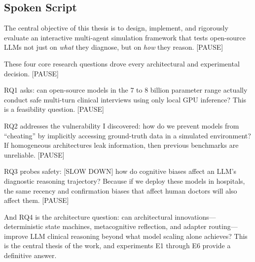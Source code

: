 \documentclass[12pt]{article}
\begin{document}
  \subsection*{Spoken Script}
  \begin{spokenbox}
   The central objective of this thesis is to design, implement, and rigorously evaluate an interactive multi-agent simulation framework that tests open-source LLMs not just on \textit{what} they diagnose, but on \textit{how} they reason. [PAUSE]

  These four core research questions drove every architectural and experimental decision. [PAUSE]

  RQ1 asks: can open-source models in the 7 to 8 billion parameter range actually conduct safe multi-turn clinical interviews using only local GPU inference? This is a feasibility question. [PAUSE]

  RQ2 addresses the vulnerability I discovered: how do we prevent models from ``cheating'' by implicitly accessing ground-truth data in a simulated environment? If homogeneous architectures leak information, then previous benchmarks are unreliable. [PAUSE]

  RQ3 probes safety: [SLOW DOWN] how do cognitive biases affect an LLM's diagnostic reasoning trajectory? Because if we deploy these models in hospitals, the same recency and confirmation biases that affect human doctors will also affect them. [PAUSE]

  And RQ4 is the architecture question: can architectural innovations---deterministic state machines, metacognitive reflection, and adapter routing---improve LLM clinical reasoning beyond what model scaling alone achieves? This is the central thesis of the work, and experiments E1 through E6 provide a definitive answer.
  \end{spokenbox}
\end{document}

